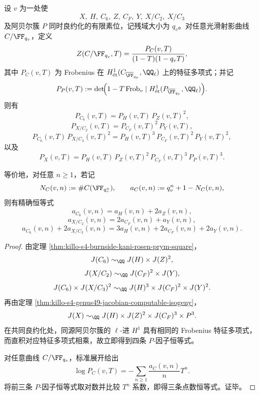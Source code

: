 \begin{conclusion}\label{con:xi-time-part9n-burnside-kani-rosen-local-zeta-pointcount}
设 \(v\) 为一处使
\[
X,\ H,\ C_6,\ Z,\ C_F,\ Y,\ X/C_2,\ X/C_3
\]
及阿贝尔簇 \(P\) 同时良约化的有限素位，记残域大小为 \(q_v\)。对任意光滑射影曲线 \(C/\FF_{q_v}\)，定义
\[
Z(C/\FF_{q_v},T)=\frac{P_C(v,T)}{(1-T)(1-q_vT)},
\]
其中 \(P_C(v,T)\) 为 Frobenius 在 \(H^1_{\text{ét}}(C_{\overline{\FF}_{q_v}},\QQ_\ell)\) 上的特征多项式；并记
\[
P_P(v,T):=
\det\!\Bigl(1-T\,\mathrm{Frob}_v\mid
H^1_{\text{ét}}(P_{\overline{\FF}_{q_v}},\QQ_\ell)\Bigr).
\]
则有
\[
P_{C_6}(v,T)=P_H(v,T)\,P_Z(v,T)^2,
\]
\[
P_{X/C_2}(v,T)=P_{C_F}(v,T)^2\,P_Y(v,T),
\]
\[
P_{C_6}(v,T)\,P_{X/C_3}(v,T)^2
=
P_H(v,T)^3\,P_{C_F}(v,T)^2\,P_Y(v,T)^2,
\]
以及
\[
P_X(v,T)=P_H(v,T)\,P_Z(v,T)^2\,P_{C_F}(v,T)^3\,P_P(v,T)^3.
\]

等价地，对任意 \(n\ge 1\)，若记
\[
N_C(v,n):=\#C(\FF_{q_v^n}),
\qquad
a_C(v,n):=q_v^n+1-N_C(v,n),
\]
则有精确恒等式
\[
a_{C_6}(v,n)=a_H(v,n)+2a_Z(v,n),
\]
\[
a_{X/C_2}(v,n)=2a_{C_F}(v,n)+a_Y(v,n),
\]
\[
a_{C_6}(v,n)+2a_{X/C_3}(v,n)
=
3a_H(v,n)+2a_{C_F}(v,n)+2a_Y(v,n).
\]
\end{conclusion}
\begin{proof}
由定理 \ref{thm:killo-s4-burnside-kani-rosen-prym-square}，
\[
J(C_6)\sim_{\QQ}J(H)\times J(Z)^2,
\]
\[
J(X/C_2)\sim_{\QQ}J(C_F)^2\times J(Y),
\]
\[
J(C_6)\times J(X/C_3)^2
\sim_{\QQ}
J(H)^3\times J(C_F)^2\times J(Y)^2.
\]
再由定理 \ref{thm:killo-s4-genus49-jacobian-computable-isogeny}，
\[
J(X)\sim_{\QQ}J(H)\times J(Z)^2\times J(C_F)^3\times P^3.
\]
在共同良约化处，同源阿贝尔簇的 \(\ell\)-进 \(H^1\) 具有相同的 Frobenius 特征多项式，而直积对应特征多项式相乘，故立即得到四条 \(P\)-因子恒等式。

对任意曲线 \(C/\FF_{q_v}\)，标准展开给出
\[
\log P_C(v,T)=-\sum_{n\ge 1}\frac{a_C(v,n)}{n}T^n.
\]
将前三条 \(P\)-因子恒等式取对数并比较 \(T^n\) 系数，即得三条点数恒等式。证毕。
\end{proof}

